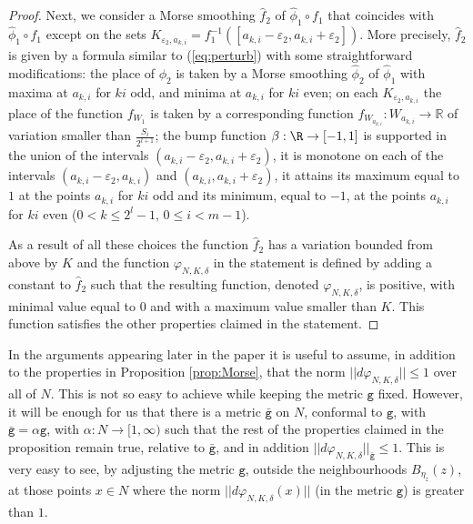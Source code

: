 \begin{proof}
Next, we consider a Morse smoothing $\hat{f}_{2}$ of $\hat{\phi}_{1}\circ f_{1}$ that coincides
with $\hat{\phi}_{1}\circ f_{1}$ except on the sets 
$K_{\varepsilon_{2}, a_{k,i}}=f^{-1}_{1}([a_{k,i}-\varepsilon_{2}, a_{k,i}+\varepsilon_{2}])$. More precisely, $\hat{f}_{2}$
is given by a formula similar to (\ref{eq:perturb}) with some straightforward modifications:  the place of $\phi_{2}$ is taken
by a Morse smoothing $\hat{\phi}_{2}$ of $\hat{\phi}_{1}$ with maxima at $a_{k,i}$ for $ki$ odd, and minima
at $a_{k,i}$ for $ki$ even; on each $K_{\varepsilon_{2}, a_{k,i}}$ the place of the function $f_{W_{1}}$ is taken by a corresponding 
function $f_{W_{a_{k,i}}}: W_{a_{k,i}}\to \mathbb{R}$ of variation smaller than $\frac{S_{i}}{2^{l+1}}$; the bump function
$\beta:\R\to [-1,1]$ is supported in the union of the intervals $(a_{k,i}-\varepsilon_{2}, a_{k,i}+\varepsilon_{2})$, it is monotone on each of the intervals $(a_{k,i}-\varepsilon_{2}, a_{k,i})$ and $(a_{k,i}, a_{k,i}+\varepsilon_{2})$, it attains its maximum equal
to $1$ at the points $a_{k,i}$ for $ki$ odd and its minimum, equal to $-1$, at the points $a_{k,i}$ for $ki$ even ($0< k \leq 2^{l}-1$, $0\leq i < m-1$). 

As a result of all these choices the function $\hat{f}_{2}$ has a variation bounded from above by $K$ and the function $\varphi_{N,K,\delta}$ in the statement is defined
by adding a constant to $\hat{f}_{2}$ such that the resulting
function, denoted $\varphi_{N,K,\delta}$, is positive, with minimal value equal to $0$ and with a maximum value smaller than $K$. This function satisfies the other properties claimed in the statement.
\end{proof}

\begin{rem}\label{rem:conf_metric} In the arguments appearing later in the paper it is useful to assume, in addition to the properties in Proposition \ref{prop:Morse}, that the norm $||d\varphi_{N,K,\delta}||\leq 1$ over all of $N$. This is not so easy to achieve while keeping the metric $\texttt{g}$ fixed. However, it will be enough for us that there is a metric 
$\bar{\texttt{g}}$ on $N$, conformal to $\texttt{g}$, with $\bar{\texttt{g}}=\alpha \texttt{g}$, with $\alpha:N\to [1,\infty)$ such that the rest of the properties claimed in the proposition remain true, relative to $\bar{\texttt{g}}$,
and in addition $||d\varphi_{N,K,\delta}||_{\bar{\texttt{g}}}\leq 1$.  This is very easy to see, by adjusting the metric $\texttt{g}$, outside the neighbourhoods $B_{\eta_{z}}(z)$, at those points $x\in N$ where the norm $||d\varphi_{N,K,\delta}(x)||$ (in the metric $\texttt{g}$) is greater than $1$.
\end{rem}


